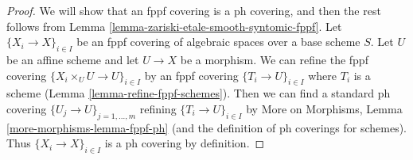 \documentclass{stacks-project}
\theoremstyle{plain}
\theoremstyle{definition}
\theoremstyle{remark}
\numberwithin{equation}{subsection}
\begin{document}
\begin{proof}
We will show that an fppf covering is a ph covering, and then the
rest follows from Lemma \ref{lemma-zariski-etale-smooth-syntomic-fppf}.
Let $\{X_i \to X\}_{i \in I}$ be an fppf covering of algebraic spaces
over a base scheme $S$. Let $U$ be an affine scheme and let
$U \to X$ be a morphism. We can refine the fppf covering
$\{X_i \times_U U \to U\}_{i \in I}$ by an fppf covering
$\{T_i \to U\}_{i \in I}$ where $T_i$ is a scheme
(Lemma \ref{lemma-refine-fppf-schemes}).
Then we can find a standard ph covering $\{U_j \to U\}_{j = 1, \ldots, m}$
refining $\{T_i \to U\}_{i \in I}$ by
More on Morphisms, Lemma \ref{more-morphisms-lemma-fppf-ph}
(and the definition of ph coverings for schemes).
Thus $\{X_i \to X\}_{i \in I}$ is a ph covering by definition.
\end{proof}
\end{document}
